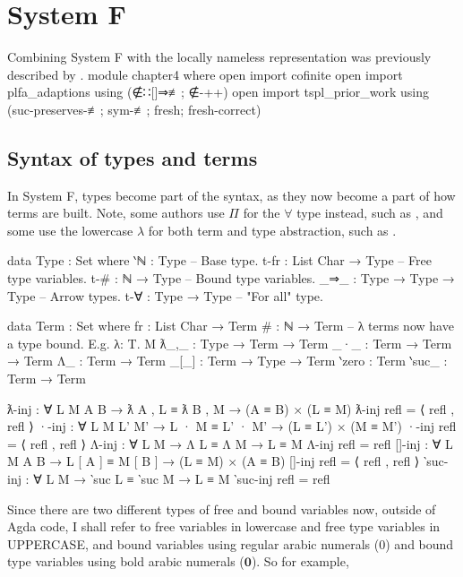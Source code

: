 \documentclass[logo,bsc,singlespacing,parskip,online]{infthesis}
\renewenvironment{code}{\mintedcopy[breaklines,breaksymbolleft=\;]{agda}}{\endmintedcopy}
\begin{document}
\chapter{System F}
Combining System F with the locally nameless representation was previously described by
\citet{chargueraud_locally_2012}.
\begin{code}
module chapter4 where
  open import cofinite
  open import plfa_adaptions using (∉∷[]⇒≢; ∉-++)
  open import tspl_prior_work
    using (suc-preserves-≢; sym-≢; fresh; fresh-correct)
\end{code}

\section{Syntax of types and terms}
In System F, types become part of the syntax, as they now become a part of how terms are built.
Note, some authors use $\Pi$ for the $∀$ type instead, such as \citet{hutton_system_2019}, and some
use the lowercase $\lambda$ for both term and type abstraction, such as \citet{pierce_types_2002}.

\begin{code}
  data Type : Set where
    ‵ℕ      : Type               -- Base type.
    t-fr     : List Char → Type   -- Free type variables.
    t-#      : ℕ → Type           -- Bound type variables.
    _⇒_      : Type → Type → Type -- Arrow types.
    t-∀      : Type → Type        -- "For all" type.

  data Term : Set where
    fr     : List Char → Term
    #      : ℕ → Term
    -- λ terms now have a type bound. E.g. λ: T. M
    ƛ_,_   : Type → Term → Term
    _·_    : Term → Term → Term
    Λ_     : Term → Term
    _[_]   : Term → Type → Term
    ‵zero  : Term
    ‵suc_  : Term → Term

  ƛ-inj : ∀ {L M A B}
    → ƛ A , L ≡ ƛ B , M → (A ≡ B) × (L ≡ M)
  ƛ-inj refl = ⟨ refl , refl ⟩
  ·-inj : ∀ {L M L' M'}
    → L · M ≡ L' · M' → (L ≡ L') × (M ≡ M')
  ·-inj refl = ⟨ refl , refl ⟩
  Λ-inj : ∀ {L M}
    → Λ L ≡ Λ M → L ≡ M
  Λ-inj refl = refl
  []-inj : ∀ {L M A B}
    → L [ A ] ≡ M [ B ] → (L ≡ M) × (A ≡ B)
  []-inj refl = ⟨ refl , refl ⟩
  ‵suc-inj : ∀ {L M}
    → ‵suc L ≡ ‵suc M → L ≡ M
  ‵suc-inj refl = refl
\end{code}

Since there are two different types of free and bound variables now, outside of Agda code, I shall
refer to free variables in lowercase and free type variables in UPPERCASE, and bound variables using
regular arabic numerals ($0$) and bound type variables using bold arabic numerals ($\mathbf{0}$). So
for example,
\end{document}
